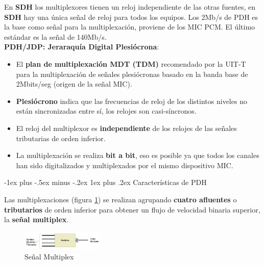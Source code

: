\documentclass[10pt,portrait, twocolumn]{article}
\makeatletter
\renewcommand{\subsubsection}{\@startsection{subsubsection}{3}{0mm}%
                                {-1ex plus -.5ex minus -.2ex}%
                                {1ex plus .2ex}%
                                {\normalfont\small\bfseries}}
\makeatother
\begin{document}
  
En \textbf{SDH} los multiplexores tienen un reloj independiente de las otras fuentes, en \textbf{SDH} hay una única señal de reloj para todos los equipos. Los 2Mb/s de PDH es la base como señal para la multiplexación, proviene de los MIC PCM. El último estándar es la señal de 140Mb/s.\\

\textbf{PDH/JDP: Jeraraquía Digital Plesiócrona}:

	\begin{itemize}
	\item El \textbf{plan de multiplexación MDT (TDM)} recomendado por la UIT-T para la multiplexación de señales plesiócronas basado en la banda base de 2Mbits/seg (origen de la señal MIC).
	\item  \textbf{Plesiócrono} indica que las frecuencias de reloj de los distintos niveles no están sincronizadas entre sí, los relojes son casi-síncronos. 
	\item El reloj del multiplexor es \textbf{independiente} de los relojes de las señales tributarias de orden inferior. 
	\item La multiplexación se realiza \textbf{bit a bit}, eso es posible ya que todos los canales han sido digitalizados y multiplexados por el mismo dispositivo MIC.
	\end{itemize}



\subsubsection{Características de PDH}

Las multiplexaciones (figura \ref{fig:Multiplex}) se realizan agrupando \textbf{cuatro afluentes} o \textbf{tributarios} de orden inferior para obtener un flujo de velocidad binaria superior, la \textbf{señal multiplex}.

\begin{figure}[ht]
	\centering
     \includegraphics[width=0.35\textwidth]{Multiplex}
      \caption{Señal Multiplex}
      \label{fig:Multiplex}
  \end{figure}
\end{document}
